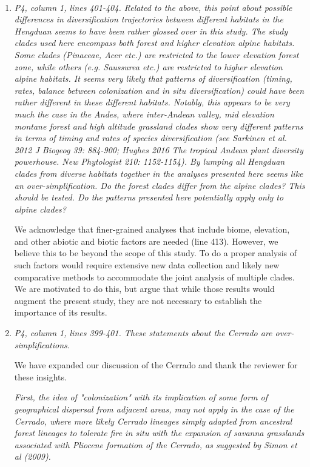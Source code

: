 \documentclass[11pt]{letter}
\begin{document}
\begin{letter}{ \\

}
\begin{enumerate}
\item \textit{P4, column 1, lines 401-404. Related to the above, this
    point about possible differences in diversification trajectories
    between different habitats in the Hengduan seems to have been
    rather glossed over in this study. The study clades used here
    encompass both forest and higher elevation alpine habitats. Some
    clades (Pinaceae, Acer etc.)  are restricted to the lower
    elevation forest zone, while others (e.g. Saussurea etc.) are
    restricted to higher elevation alpine habitats. It seems very
    likely that patterns of diversification (timing, rates, balance
    between colonization and in situ diversification) could have been
    rather different in these different habitats.  Notably, this
    appears to be very much the case in the Andes, where inter-Andean
    valley, mid elevation montane forest and high altitude grassland
    clades show very different patterns in terms of timing and rates
    of species diversification (see Sarkinen et al. 2012 J Biogeog 39:
    884-900; Hughes 2016 The tropical Andean plant diversity
    powerhouse. New Phytologist 210: 1152-1154). By lumping all
    Hengduan clades from diverse habitats together in the analyses
    presented here seems like an over-simplification. Do the forest
    clades differ from the alpine clades? This should be tested. Do
    the patterns presented here potentially apply only to alpine
    clades?}

  We acknowledge that finer-grained analyses that include biome,
  elevation, and other abiotic and biotic factors are needed (line
  413). However, we believe this to be beyond the scope of this
  study. To do a proper analysis of such factors would require
  extensive new data collection and likely new comparative methods to
  accommodate the joint analysis of multiple clades. We are motivated
  to do this, but argue that while those results would augment the
  present study, they are not necessary to establish the importance of
  its results.

\item \textit{P4, column 1, lines 399-401. These statements about the
    Cerrado are over-simplifications.}

  We have expanded our discussion of the Cerrado and thank the
  reviewer for these insights.

  \textit{First, the idea of "colonization" with its implication of
    some form of geographical dispersal from adjacent areas, may not
    apply in the case of the Cerrado, where more likely Cerrado
    lineages simply adapted from ancestral forest lineages to tolerate
    fire in situ with the expansion of savanna grasslands associated
    with Pliocene formation of the Cerrado, as suggested by Simon et
    al (2009).}


\end{enumerate}
\end{letter}
\end{document}
